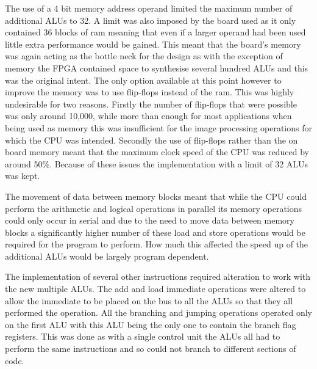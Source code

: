 The use of a 4 bit memory address operand limited the maximum number of additional ALUs to 32. A limit was also imposed by the board used as it only contained 36 blocks of ram meaning that even if a larger operand had been used little extra performance would be gained. This meant that the board’s memory was again acting as the bottle neck for the design as with the exception of memory the FPGA contained space to synthesise several hundred ALUs and this was the original intent. The only option available at this point however to improve the memory was to use flip-flops instead of the ram. This was highly undesirable for two reasons. Firstly the number of flip-flops that were possible was only around 10,000, while more than enough for most applications when being used as memory this was insufficient for the image processing operations for which the CPU was intended. Secondly the use of flip-flops rather than the on board memory meant that the maximum clock speed of the CPU was reduced by around 50\%. Because of these issues the implementation with a limit of 32 ALUs was kept.

The movement of data between memory blocks meant that while the CPU could perform the arithmetic and logical operations in parallel its memory operations could only occur in serial and due to the need to move data between memory blocks a significantly higher number of these load and store operations would be required for the program to perform. How much this affected the speed up of the additional ALUs would be largely program dependent. 

The implementation of several other instructions required alteration to work with the new multiple ALUs. The add and load immediate operations were altered to allow the immediate to be placed on the bus to all the ALUs so that they all performed the operation. All the branching and jumping operations operated only on the first ALU with this ALU being the only one to contain the branch flag registers. This was done as with a single control unit the ALUs all had to perform the same instructions and so could not branch to different sections of code.